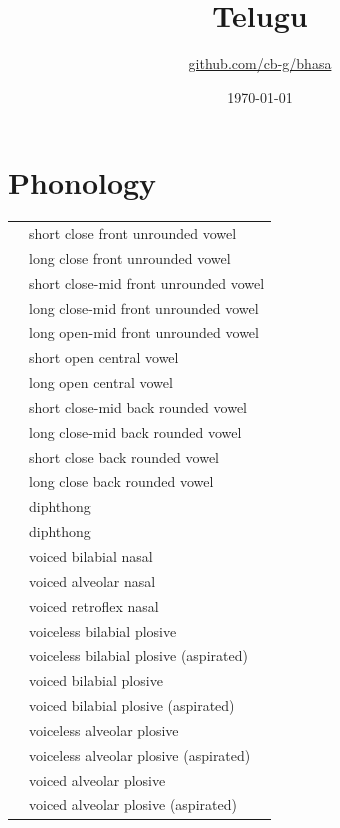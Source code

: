 \documentclass{article}
\title{Telugu\\\ipa{["telugu]}}
\author{\href{https://github.com/cb-g/bhasa}{github.com/cb-g/bhasa}}
\date{\today}
\begin{document}
\pagecolor{custom_bg}\color{custom_fg}
\maketitle\thispagestyle{empty}

\newpage\setcounter{page}{1}\section{Phonology}

\begin{xltabular}{\textwidth}{lL}
   & short close front unrounded vowel \\
   & long close front unrounded vowel \\
   & short close-mid front unrounded vowel \\
   & long close-mid front unrounded vowel \\
   & long open-mid front unrounded vowel \\
   & short open central vowel \\
   & long open central vowel \\
   & short close-mid back rounded vowel \\
   & long close-mid back rounded vowel \\
   & short close back rounded vowel \\
   & long close back rounded vowel \\
   & diphthong \\
   & diphthong \\
   & voiced bilabial nasal \\
   & voiced alveolar nasal \\
   & voiced retroflex nasal \\
   & voiceless bilabial plosive \\
   & voiceless bilabial plosive (aspirated) \\
   & voiced bilabial plosive \\
   & voiced bilabial plosive (aspirated) \\
   & voiceless alveolar plosive \\
   & voiceless alveolar plosive (aspirated) \\
   & voiced alveolar plosive \\
   & voiced alveolar plosive (aspirated) \\

\end{xltabular}
\end{document}
